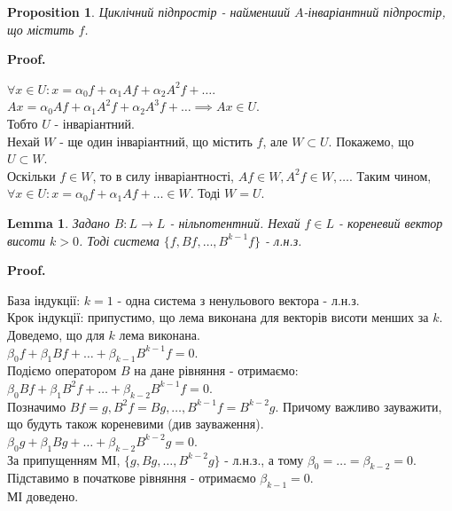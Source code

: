 \documentclass[a4paper, 10pt]{article}
\makeatletter
\theoremstyle{theoremdd}
\newtheorem{proposition}[theorem]{Proposition}
\newtheorem{lemma}[theorem]{Lemma}
\renewenvironment{proof}[1][Proof.\\]{\par
\pushQED{\hfill \qed}%
\normalfont \topsep6\p@\@plus6\p@\relax
\trivlist
\item\relax
{\bfseries
#1\@addpunct{.}}\hspace\labelsep\ignorespaces
}{%
\popQED\endtrivlist\@endpefalse
}
\makeatother
\begin{document}
\begin{proposition}
Циклічний підпростір - найменший $A$-інваріантний підпростір, що містить $f$.
\end{proposition}

\begin{proof}
$\forall x \in U: x = \alpha_0 f + \alpha_1 Af + \alpha_2 A^2 f + \dots$.\\
$Ax = \alpha_0 Af + \alpha_1 A^2f + \alpha_2 A^3 f + \dots \implies Ax \in U$.\\
Тобто $U$ - інваріантний.\\
Нехай $W$ - ще один інваріантний, що містить $f$, але $W \subset U$. Покажемо, що $U \subset W$.\\
Оскільки $f \in W$, то в силу інваріантності, $Af \in W, A^2f \in W, \dots$. Таким чином,\\
$\forall x \in U: x = \alpha_0 f + \alpha_1 Af + \dots \in W$. Тоді $W = U$.
\end{proof}

\begin{lemma}
Задано $B \colon L \to L$ - нільпотентний. Нехай $f \in L$ - кореневий вектор висоти $k>0$. Тоді система $\{f,Bf,\dots,B^{k-1}f\}$ - л.н.з.
\end{lemma}

\begin{proof}
База індукції: $k = 1$ - одна система з ненульового вектора - л.н.з.\\
Крок індукції: припустимо, що лема виконана для векторів висоти менших за $k$. Доведемо, що для $k$ лема виконана.\\
$\beta_0 f + \beta_1 Bf + \dots + \beta_{k-1}B^{k-1}f = 0$.\\
Подіємо оператором $B$ на дане рівняння - отримаємо:\\
$\beta_0 Bf + \beta_1 B^2f + \dots + \beta_{k-2}B^{k-1}f = 0$.\\
Позначимо $Bf = g, B^2f = Bg, \dots, B^{k-1}f = B^{k-2}g$. Причому важливо зауважити, що будуть також кореневими (див зауваження).\\
$\beta_0 g + \beta_1 Bg + \dots + \beta_{k-2} B^{k-2}g = 0$.\\
За припущенням МІ, $\{g,Bg,\dots,B^{k-2}g\}$ - л.н.з., а тому $\beta_0 = \dots = \beta_{k-2} = 0$.\\
Підставимо в початкове рівняння - отримаємо $\beta_{k-1} = 0$.\\
МІ доведено.
\end{proof}
\end{document}
